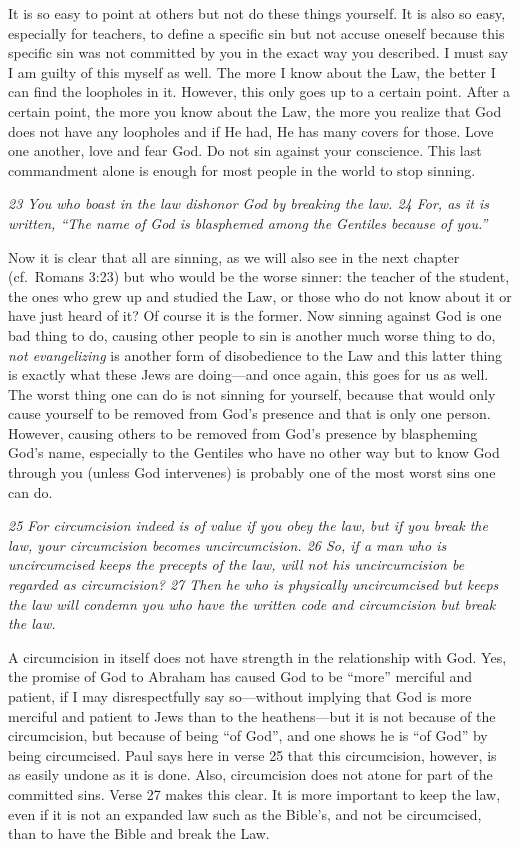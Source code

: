 It is so easy to point at others but not do these things yourself. It is
also so easy, especially for teachers, to define a specific sin but not
accuse oneself because this specific sin was not committed by you in the
exact way you described. I must say I am guilty of this myself as well.
The more I know about the Law, the better I can find the loopholes in
it. However, this only goes up to a certain point. After a certain
point, the more you know about the Law, the more you realize that God
does not have any loopholes and if He had, He has many covers for those.
Love one another, love and fear God. Do not sin against your conscience.
This last commandment alone is enough for most people in the world to
stop sinning.

\emph{23 You who boast in the law dishonor God by breaking the law. 24
For, as it is written, ``The name of God is blasphemed among the
Gentiles because of you.''}

Now it is clear that all are sinning, as we will also see in the next
chapter (cf.~Romans 3:23) but who would be the worse sinner: the teacher
of the student, the ones who grew up and studied the Law, or those who
do not know about it or have just heard of it? Of course it is the
former. Now sinning against God is one bad thing to do, causing other
people to sin is another much worse thing to do, \emph{not evangelizing}
is another form of disobedience to the Law and this latter thing is
exactly what these Jews are doing---and once again, this goes for us as
well. The worst thing one can do is not sinning for yourself, because
that would only cause yourself to be removed from God's presence and
that is only one person. However, causing others to be removed from
God's presence by blaspheming God's name, especially to the Gentiles who
have no other way but to know God through you (unless God intervenes) is
probably one of the most worst sins one can do.

\emph{25 For circumcision indeed is of value if you obey the law, but if
you break the law, your circumcision becomes uncircumcision. 26 So, if a
man who is uncircumcised keeps the precepts of the law, will not his
uncircumcision be regarded as circumcision? 27 Then he who is physically
uncircumcised but keeps the law will condemn you who have the written
code and circumcision but break the law.}

A circumcision in itself does not have strength in the relationship with
God. Yes, the promise of God to Abraham has caused God to be ``more''
merciful and patient, if I may disrespectfully say so---without implying
that God is more merciful and patient to Jews than to the heathens---but
it is not because of the circumcision, but because of being ``of God'',
and one shows he is ``of God'' by being circumcised. Paul says here in
verse 25 that this circumcision, however, is as easily undone as it is
done. Also, circumcision does not atone for part of the committed sins.
Verse 27 makes this clear. It is more important to keep the law, even if
it is not an expanded law such as the Bible's, and not be circumcised,
than to have the Bible and break the Law.

